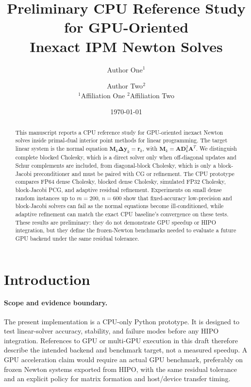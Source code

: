 \documentclass[11pt,twoside]{article}
\title{
  Preliminary CPU Reference Study for GPU-Oriented \\
  Inexact IPM Newton Solves
}
\author{
  Author One$^{1}$ \and Author Two$^{2}$ \\
  \small $^{1}$Affiliation One \qquad $^{2}$Affiliation Two
}
\date{\today}
\newcommand{\bA}{\mathbf{A}}
\newcommand{\by}{\mathbf{y}}
\newcommand{\bD}{\mathbf{D}}
\newcommand{\bM}{\mathbf{M}}
\newcommand{\br}{\mathbf{r}}
\newcommand{\bDelta}{\mathbf{\Delta}}
\begin{document}
\maketitle

\begin{abstract}
  This manuscript reports a CPU reference study for GPU-oriented inexact
  Newton solves inside primal-dual interior point methods for linear
  programming.  The target linear system is the normal equation
  $\bM_k \bDelta\by_k = \br_k$, with
  $\bM_k = \bA\bD_k^2\bA^T$.  We distinguish complete blocked Cholesky,
  which is a direct solver only when off-diagonal updates and Schur
  complements are included, from diagonal-block Cholesky, which is only a
  block-Jacobi preconditioner and must be paired with CG or refinement.
  The CPU prototype compares FP64 dense Cholesky, blocked dense Cholesky,
  simulated FP32 Cholesky, block-Jacobi PCG, and adaptive residual
  refinement.  Experiments on small dense random instances up to
  $m=200$, $n=600$ show that fixed-accuracy low-precision and
  block-Jacobi solvers can fail as the normal equations become
  ill-conditioned, while adaptive refinement can match the exact CPU
  baseline's convergence on these tests.  These results are preliminary:
  they do not demonstrate GPU speedup or HIPO integration, but they define
  the frozen-Newton benchmarks needed to evaluate a future GPU backend
  under the same residual tolerance.
\end{abstract}

\section{Introduction}
\label{sec:intro}

\paragraph{Scope and evidence boundary.}
The present implementation is a CPU-only Python prototype.  It is designed
to test linear-solver accuracy, stability, and failure modes before any
HIPO integration.  References to GPU or multi-GPU execution in this draft
therefore describe the intended backend and benchmark target, not a
measured speedup.  A GPU acceleration claim would require an actual GPU
benchmark, preferably on frozen Newton systems exported from HIPO, with
the same residual tolerance and an explicit policy for matrix formation
and host/device transfer timing.
\end{document}
